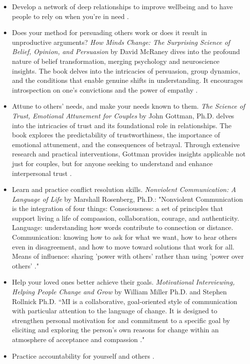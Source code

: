 \documentclass[12pt,letterpaper]{article}
\begin{document}
\begin{itemize}
    \item Develop a network of deep relationships to improve wellbeing and to have people to rely on when you're in need \cite{holt-lunstadRelationships}.
    \item Does your method for persuading others work or does it result in unproductive arguments? \textit{How Minds Change: The Surprising Science of Belief, Opinion, and Persuasion} by David McRaney dives into the profound nature of belief transformation, merging psychology and neuroscience insights. The book delves into the intricacies of persuasion, group dynamics, and the conditions that enable genuine shifts in understanding. It encourages introspection on one's convictions and the power of empathy \cite{mcraneyMinds}.
    \item Attune to others' needs, and make your needs known to them. \textit{The Science of Trust, Emotional Attunement for Couples} by John Gottman, Ph.D. delves into the intricacies of trust and its foundational role in relationships. The book explores the predictability of trustworthiness, the importance of emotional attunement, and the consequences of betrayal. Through extensive research and practical interventions, Gottman provides insights applicable not just for couples, but for anyone seeking to understand and enhance interpersonal trust \cite{gottmanTrust}.
    \item Learn and practice conflict resolution skills. \textit{Nonviolent Communication: A Language of Life} by Marshall Rosenberg, Ph.D.: "Nonviolent Communication is the integration of four things: Consciousness: a set of principles that support living a life of compassion, collaboration, courage, and authenticity. Language: understanding how words contribute to connection or distance. Communication: knowing how to ask for what we want, how to hear others even in disagreement, and how to move toward solutions that work for all. Means of influence: sharing 'power with others' rather than using 'power over others' \cite{rosenbergNVC}."
    \item Help your loved ones better achieve their goals. \textit{Motivational Interviewing, Helping People Change and Grow} by William Miller Ph.D. and Stephen Rollnick Ph.D. “MI is a collaborative, goal-oriented style of communication with particular attention to the language of change. It is designed to strengthen personal motivation for and commitment to a specific goal by eliciting and exploring the person's own reasons for change within an atmosphere of acceptance and compassion \cite{millerMotivationalInterviewing}."
    \item Practice accountability for yourself and others \cite{mingusAccountability,barnardCommunities}. 
\end{itemize}
\end{document}
